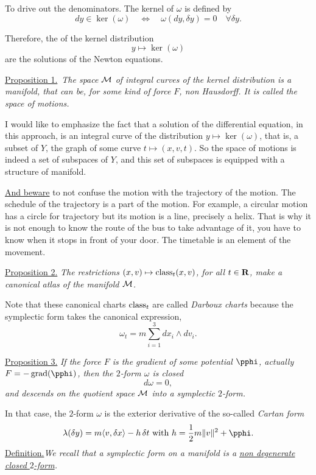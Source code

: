 \begin{Article}{To drive out the denominators.}{}
  The kernel of $\omega$ is defined by
  $$%
    dy \in \ker(\omega) \quad \Leftrightarrow \quad \omega(dy,\delta y) = 0 \quad \forall \delta y.
    $$%
  
  Therefore,
  the  of the kernel distribution
  $$%
    y \mapsto \ker(\omega)
    $$%
  are the solutions of the Newton equations.
  
  \uline{Proposition 1.}~{\itshape The space $\mathcal{M}$ of integral curves of the kernel distribution is a manifold,
  that can be,
  for some kind of force $F$,
  non Hausdorff.
  It is called the \emph{space of motions}.}
  
  I would like to emphasize the fact that a solution of the differential equation,
  in this approach, is an integral curve of the distribution $y \mapsto \ker(\omega)$,
  that is,
  a subset of $Y$,
  the graph of some curve $t \mapsto (x,v,t)$.
  So the space of motions is indeed a set of subspaces of $Y$,
  and this set of subspaces is equipped with a structure of manifold.
  
  \uline{And beware} to not confuse the motion with the trajectory of the motion.
  The schedule of the trajectory is a part of the motion.
  For example,
  a circular motion has a circle for trajectory but its motion is a line,
  precisely a helix.
  That is why it is not enough to know the route of the bus to take advantage of it,
  you have to know when it stops in front of your door.
  The timetable is an element of the movement.
  
  \uline{Proposition 2.} {\itshape The restrictions $(x,v) \mapsto \operatorname{class}_t(x,v)$,
  for all $t \in \mathbf{R}$,
  make a canonical atlas of the manifold $\mathcal{M}$.}
  
  Note that these canonical charts $\operatorname{class}_t$ are called \emph{Darboux charts} because the symplectic form takes the canonical expression,
  $$%
    \omega_t = m \sum_{i=1}^3 dx_i \wedge dv_i.
    $$%
  
  \uline{Proposition 3.} {\itshape If the force $F$ is the gradient of some \emph{potential} $\pphi$,
  actually $F = - \grad(\pphi)$,
  then the $2$-form $\omega$ is closed
  $$%
    d\omega = 0,
    $$%
  and descends on the quotient space $\mathcal{M}$ into a symplectic $2$-form.}
  
  In that case,
  the $2$-form $\omega$ is the exterior derivative of the so-called \emph{Cartan form}
  $$%
    \lambda(\delta y) = m \langle v,\delta x\rangle - h\, \delta t
    \SpacedText{with}
    h = {1 \over 2} m \Norm{v}^2 + \pphi.
    $$%
  \uline{Definition.}{\itshape We recall that a symplectic form on a manifold is a \uline{non degenerate closed $2$-form}.}
\end{Article}

